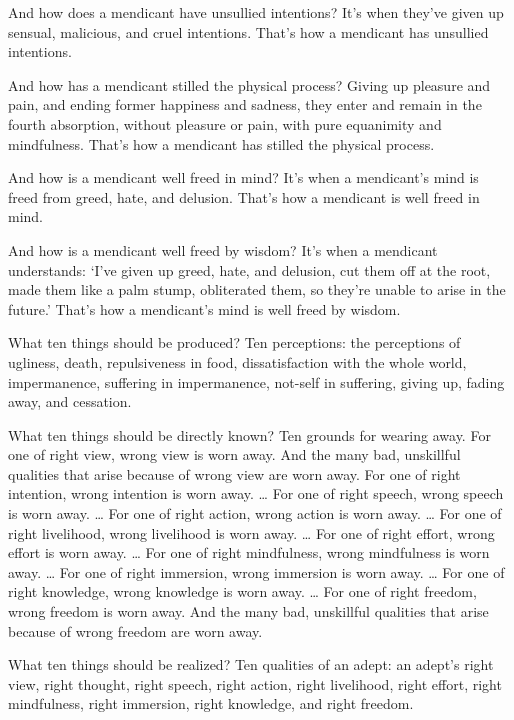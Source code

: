 \documentclass[12pt,openany]{book}%
\begin{document}
And how does a mendicant have unsullied intentions? It’s when they’ve given up sensual, malicious, and cruel intentions. That’s how a mendicant has unsullied intentions. 

And how has a mendicant stilled the physical process? Giving up pleasure and pain, and ending former happiness and sadness, they enter and remain in the fourth absorption, without pleasure or pain, with pure equanimity and mindfulness. That’s how a mendicant has stilled the physical process. 

And how is a mendicant well freed in mind? It’s when a mendicant’s mind is freed from greed, hate, and delusion. That’s how a mendicant is well freed in mind. 

And how is a mendicant well freed by wisdom? It’s when a mendicant understands: ‘I’ve given up greed, hate, and delusion, cut them off at the root, made them like a palm stump, obliterated them, so they’re unable to arise in the future.’ That’s how a mendicant’s mind is well freed by wisdom. 

What ten things should be produced? Ten perceptions: the perceptions of ugliness, death, repulsiveness in food, dissatisfaction with the whole world, impermanence, suffering in impermanence, not-self in suffering, giving up, fading away, and cessation. 

What ten things should be directly known? Ten grounds for wearing away. For one of right view, wrong view is worn away. And the many bad, unskillful qualities that arise because of wrong view are worn away. For one of right intention, wrong intention is worn away. … For one of right speech, wrong speech is worn away. … For one of right action, wrong action is worn away. … For one of right livelihood, wrong livelihood is worn away. … For one of right effort, wrong effort is worn away. … For one of right mindfulness, wrong mindfulness is worn away. … For one of right immersion, wrong immersion is worn away. … For one of right knowledge, wrong knowledge is worn away. … For one of right freedom, wrong freedom is worn away. And the many bad, unskillful qualities that arise because of wrong freedom are worn away. 

What ten things should be realized? Ten qualities of an adept: an adept’s right view, right thought, right speech, right action, right livelihood, right effort, right mindfulness, right immersion, right knowledge, and right freedom. 
\end{document}
